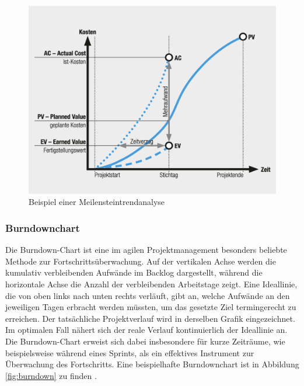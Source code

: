 \documentclass[ThesisDJ.tex]{subfiles}
\begin{document}
    \begin{figure}
        \includegraphics[scale=0.5]{mta.png}
        \centering
        \caption{Beispiel einer Meilensteintrendanalyse}
        \label{fig:mta}
    \end{figure}

    \subsubsection{Burndownchart}
    Die Burndown-Chart ist eine im agilen Projektmanagement besonders beliebte Methode zur Fortschrittsüberwachung. 
    Auf der vertikalen Achse werden die kumulativ verbleibenden Aufwände im Backlog dargestellt, während die horizontale Achse die Anzahl der verbleibenden Arbeitstage zeigt. 
    Eine Ideallinie, die von oben links nach unten rechts verläuft, gibt an, welche Aufwände an den jeweiligen Tagen erbracht werden müssten, um das gesetzte Ziel termingerecht zu erreichen. 
    Der tatsächliche Projektverlauf wird in derselben Grafik eingezeichnet. Im optimalen Fall nähert sich der reale Verlauf kontinuierlich der Ideallinie an. 
    Die Burndown-Chart erweist sich dabei insbesondere für kurze Zeiträume, wie beispielsweise während eines Sprints, als ein effektives Instrument zur Überwachung des Fortschritts.
    Eine beispielhafte Burndownchart ist in Abbildung \ref{fig:burndown} zu finden \cite[S.~279]{dechange_projektmanagement_2024}.
\end{document}
